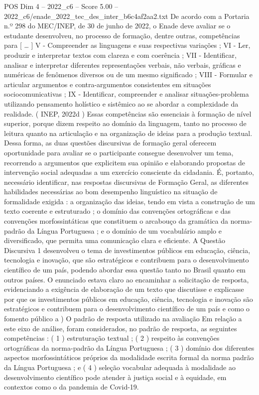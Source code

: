 \begin{textsample}{POS Dim 4 – 2022\_c6 – Score 5.00 – 2022\_c6/enade\_2022\_tec\_des\_inter\_b6c4af2aa2.txt}
De acordo com a Portaria n.º 298 do MEC/INEP, de 30 de junho de 2022, o Enade deve avaliar se o estudante desenvolveu, no processo de formação, dentre outras, competências para [ … ] V - Compreender as linguagens e suas respectivas variações ; VI - Ler, produzir e interpretar textos com clareza e com coerência ; VII - Identificar, analisar e interpretar diferentes representações verbais, não verbais, gráficas e numéricas de fenômenos diversos ou de um mesmo significado ; VIII - Formular e articular argumentos e contra-argumentos consistentes em situações sociocomunicativas ; IX - Identificar, compreender e analisar situações-problema utilizando pensamento holístico e sistêmico ao se abordar a complexidade da realidade. ( INEP, 2022d ) Essas competências são essenciais à formação de nível superior, porque dizem respeito ao domínio da linguagem, tanto no processo de leitura quanto na articulação e na organização de ideias para a produção textual.
Dessa forma, as duas questões discursivas de formação geral oferecem oportunidade para avaliar se o participante consegue desenvolver um tema, recorrendo a argumentos que explicitem sua opinião e elaborando propostas de intervenção social adequadas a um exercício consciente da cidadania.
É, portanto, necessário identificar, nas respostas discursivas de Formação Geral, as diferentes habilidades necessárias ao bom desempenho linguístico na situação de formalidade exigida : a organização das ideias, tendo em vista a construção de um texto coerente e estruturado ; o domínio das convenções ortográficas e das convenções morfossintáticas que constituem o arcabouço da gramática da norma-padrão da Língua Portuguesa ; e o domínio de um vocabulário amplo e diversificado, que permita uma comunicação clara e eficiente.
A Questão Discursiva 1 desenvolveu o tema de investimentos públicos em educação, ciência, tecnologia e inovação, que são estratégicos e contribuem para o desenvolvimento científico de um país, podendo abordar essa questão tanto no Brasil quanto em outros países.
O enunciado estava claro ao encaminhar a solicitação de resposta, evidenciando a exigência de elaboração de um texto que discutisse e explicasse por que os investimentos públicos em educação, ciência, tecnologia e inovação são estratégicos e contribuem para o desenvolvimento científico de um país e como o fomento público a ) O padrão de resposta utilizado na avaliação Em relação a este eixo de análise, foram considerados, no padrão de resposta, as seguintes competências : ( 1 ) estruturação textual ; ( 2 ) respeito às convenções ortográficas da norma-padrão da Língua Portuguesa ; ( 3 ) domínio dos diferentes aspectos morfossintáticos próprios da modalidade escrita formal da norma padrão da Língua Portuguesa ; e ( 4 ) seleção vocabular adequada à modalidade ao desenvolvimento científico pode atender à justiça social e à equidade, em contextos como o da pandemia de Covid-19.

\end{textsample}
